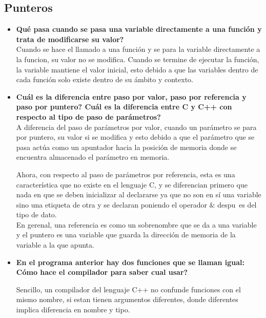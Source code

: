 \documentclass{article}
\begin{document}
\subsection*{Punteros}
\begin{itemize}
\item \textbf{Qu\' e pasa cuando se pasa una variable directamente a una funci\' on y trata de modificarse su valor?}\\

Cuando se hace el llamado a una funci\' on y se para la variable directamente a la funcion, su valor no se modifica. Cuando se termine de ejecutar la funci\' on, la variable mantiene el valor inicial, esto debido a que las variables dentro de cada funci\' on solo existe dentro de su \' ambito y contexto.

\item \textbf{Cu\' al es la diferencia entre paso por valor, paso por referencia y paso por puntero? Cu\' al es la diferencia entre C y C++ con respecto al tipo de paso de par\' ametros?}\\

A diferencia del paso de par\' ametros por valor, cuando un par\' ametro se para por puntero, su valor si se modifica y esto debido a que el par\' ametro que se pasa act\' ua como un apuntador hacia la posici\' on de memoria donde se encuentra almacenado el par\' ametro en memoria.

Ahora, con respecto al paso de par\' ametros por referencia, esta es una caracter\' istica que no existe en el lenguaje C, y se diferencian primero que nada en que se deben inicializar al declararse ya que no son en s\' i una variable sino una etiqueta de otra y se declaran poniendo el operador $\&$ despu\ es del tipo de dato.\\

En gerenal, una referencia es como un sobrenombre que se da a una variable y el puntero es una variable que guarda la direcci\' on de memoria de la variable a la que apunta.


\item \textbf{En el programa anterior hay dos funciones que se llaman igual: C\' omo hace el compilador para saber cual
usar?}

Sencillo, un compilador del lenguaje C++ no confunde funciones con el mismo nombre, si estan tienen argumentos diferentes, donde diferentes implica diferencia en nombre y tipo.


\end{itemize}
\end{document}
